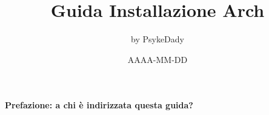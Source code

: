 \documentclass[twoside,italian]{book}
\begin{document}
	
		\posttitle{\end{center}}
	
	\begin{titlepage}
		
		
		
		\title{Guida Installazione Arch}
		
		\author{by PsykeDady}
		
		\date{AAAA-MM-DD}
		
	\end{titlepage}

	\maketitle
	\hypersetup{colorlinks=true, linkcolor=black}

	\newpage{}
	
	
	
	\begin{LARGE}
		\textbf{
			Prefazione: a chi è indirizzata questa guida?
		}


	\end{LARGE}
\end{document}
